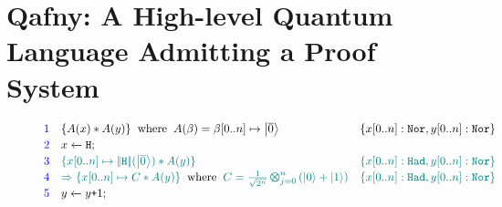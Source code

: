 \section{Qafny: A High-level Quantum Language Admitting a Proof System}
\label{sec:qafny}

\begin{figure}[t]
{\footnotesize
\[\hspace*{-0.5em}
\begin{array}{r l l}
\textcolor{blue}{1}
&
\{A(x) * A(y) \}
\;\;\text{where}\;\;
A(\beta) = \beta[0..n] \mapsto \ket{\overline{0}} 
&
\{x[0..n]: \tnort, y[0..n]: \tnort\}
\\[0.2em]
\textcolor{blue}{2}
& \ssassign{x}{}{\ihadh};\\[0.2em]

\textcolor{blue}{3}
&
\textcolor{teal}{
\{x[0..n] \mapsto \dabs{\ihadh}(\ket{\overline{0}}) * A(y) \}
}
&
\textcolor{teal}{
\{x[0..n]: \thadt, y[0..n]: \tnort\}
}
\\[0.2em]
\textcolor{blue}{4}
&
\textcolor{teal}{
\Rightarrow
\{x[0..n] \mapsto C * A(y) \}
}
\;\;\text{where}\;\;
\textcolor{teal}{
C = \shad{2^n}{n}{}
}
&
\textcolor{teal}{
\{x[0..n]: \thadt, y[0..n]: \tnort\}
}
\\[0.2em]
\textcolor{blue}{5}
& \ssassign{y}{}{y\splus 1};
\\[0.2em]


\end{array}\]}
\end{figure}
